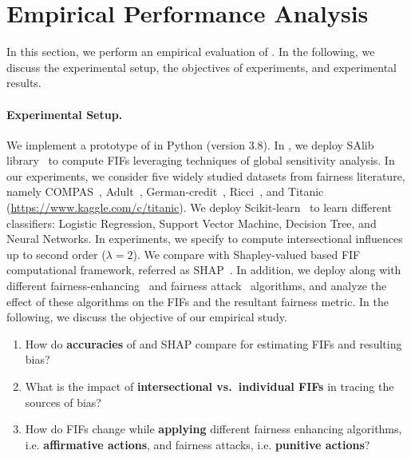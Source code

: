 \section{Empirical Performance Analysis}\label{sec:experiments}
In this section, we perform an empirical evaluation of {\fairXplainer}. In the following, we discuss the experimental setup, the objectives of experiments, and experimental results. 


\paragraph{Experimental Setup.} We implement a prototype of {\fairXplainer} in Python (version $ 3.8 $). In {\fairXplainer}, we deploy SAlib library~\cite{Herman2017} to compute FIFs leveraging techniques of global sensitivity analysis. In our experiments, we consider five widely studied datasets from fairness literature, namely COMPAS~\cite{angwin2016machine}, Adult~\cite{DK2017uci}, German-credit~\cite{DK2017}, Ricci~\cite{mcginley2010ricci}, and Titanic (\url{https://www.kaggle.com/c/titanic}). We deploy Scikit-learn~\cite{scikit-learn} to learn different classifiers: Logistic Regression, Support Vector Machine, Decision Tree, and Neural Networks. In experiments, we specify {\fairXplainer} to compute intersectional influences up to second order ($ \lambda = 2 $). We compare {\fairXplainer} with Shapley-valued based FIF computational framework, referred as SHAP~\cite{lundberg2020explaining}. In addition, we deploy {\fairXplainer} along with different fairness-enhancing~\cite{kamiran2012data} and fairness attack~\cite{solans2020poisoning} algorithms, and analyze the effect of these algorithms on the FIFs and the resultant fairness metric. In the following, we discuss the objective of our empirical study. 

\begin{enumerate}
	\item How do \textbf{accuracies} of {\fairXplainer} and SHAP compare for estimating FIFs and resulting bias?
	\item What is the impact of\textbf{ intersectional vs.\ individual FIFs} in tracing the sources of bias?
    \item How do FIFs change while \textbf{applying} different fairness enhancing algorithms, i.e. \textbf{affirmative actions}, and fairness attacks, i.e. \textbf{punitive actions}?
\end{enumerate}


